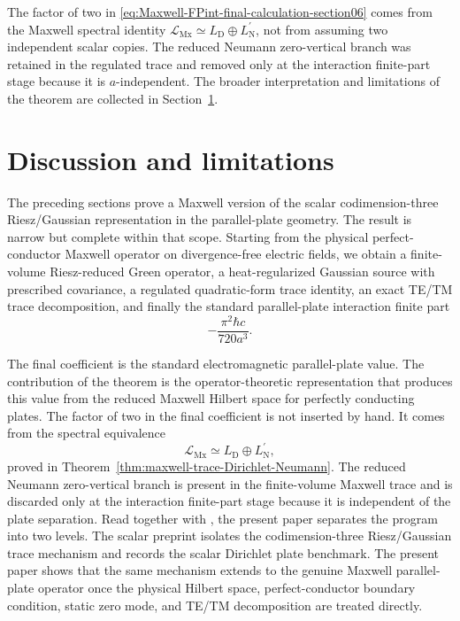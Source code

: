 \documentclass[11pt]{article}
\providecommand{\hbarc}{\hbar c}
\providecommand{\LMx}{\mathcal L_{\mathrm{Mx}}}
\providecommand{\LD}{L_{\mathrm D}}
\providecommand{\LNp}{L_{\mathrm N}^{\prime}}
\numberwithin{equation}{section}
\begin{document}
\begin{remark}
\label{rem:what-used-section06}
The factor of two in \eqref{eq:Maxwell-FPint-final-calculation-section06}
comes from the Maxwell spectral identity
\(\LMx\simeq \LD\oplus\LNp\), not from assuming two independent scalar copies.
The reduced Neumann zero-vertical branch was retained in the regulated trace
and removed only at the interaction finite-part stage because it is
\(a\)-independent.  The broader interpretation and limitations of the theorem
are collected in Section~\ref{sec:discussion-limitations}.
\end{remark}
\section{Discussion and limitations}
\label{sec:discussion-limitations}

The preceding sections prove a Maxwell version of the scalar
codimension-three Riesz/Gaussian representation in the parallel-plate geometry.
The result is narrow but complete within that scope.  Starting from the
physical perfect-conductor Maxwell operator on divergence-free electric fields,
we obtain a finite-volume Riesz-reduced Green operator, a heat-regularized
Gaussian source with prescribed covariance, a regulated quadratic-form trace
identity, an exact TE/TM trace decomposition, and finally the standard
parallel-plate interaction finite part
\[
    -\frac{\pi^2\hbarc}{720a^3} .
\]

The final coefficient is the standard electromagnetic parallel-plate value.
The contribution of the theorem is the operator-theoretic representation that
produces this value from the reduced Maxwell Hilbert space for perfectly
conducting plates.
The factor of two in the final coefficient is not inserted by hand.  It comes
from the spectral equivalence
\[
    \LMx\simeq\LD\oplus\LNp,
\]
proved in Theorem~\ref{thm:maxwell-trace-Dirichlet-Neumann}.  The reduced
Neumann zero-vertical branch is present in the finite-volume Maxwell trace and
is discarded only at the interaction finite-part stage because it is
independent of the plate separation.
Read together with \cite{KhanKhan2026Scalar}, the present paper separates the
program into two levels.  The scalar preprint isolates the codimension-three
Riesz/Gaussian trace mechanism and records the scalar Dirichlet plate
benchmark.  The present paper shows that the same mechanism extends to the
genuine Maxwell parallel-plate operator once the physical Hilbert space,
perfect-conductor boundary condition, static zero mode, and TE/TM decomposition
are treated directly.
\end{document}
